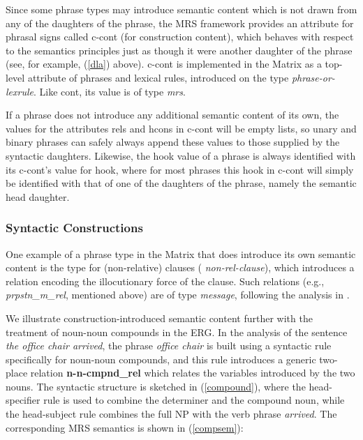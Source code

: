 \documentclass[12pt]{article}
\begin{document}
Since some phrase types may introduce semantic content which is not
drawn from any of the daughters of the phrase, the MRS framework
provides an attribute for phrasal signs called {\sc c-cont} (for
construction content), which behaves with respect to the semantics
principles just as though it were another daughter of the phrase (see,
for example, (\ref{dla}) above).  {\sc c-cont} is implemented in the
Matrix as a top-level attribute of phrases and lexical rules,
introduced on the type {\it phrase-or-lexrule}.  Like {\sc cont}, its
value is of type {\it mrs}.  

If a phrase does not introduce any additional semantic content of its
own, the values for the attributes {\sc rels} and {\sc hcons} in {\sc
c-cont} will be empty lists, so unary and binary phrases can safely
always append these values to those supplied by the syntactic
daughters.  Likewise, the {\sc hook} value of a phrase is always
identified with its {\sc c-cont}'s value for {\sc hook}, where for
most phrases this {\sc hook} in {\sc c-cont} will simply be identified
with that of one of the daughters of the phrase, namely the semantic
head daughter.

\subsubsection{Syntactic Constructions}

One example of a phrase type in the Matrix that does introduce its own
semantic content is the type for (non-relative) clauses ({\it
non-rel-clause}), which introduces a relation encoding the
illocutionary force of the clause.  Such relations (e.g., {\it
prpstn\_m\_rel}, mentioned above) are of type {\it message}, following the
analysis in \cite{Gin:Sag:00}.

We illustrate construction-introduced semantic content further with
the treatment of noun-noun compounds in the ERG.  In the analysis of the sentence {\it the office chair
arrived}, the phrase {\it office chair} is built using a syntactic
rule specifically for noun-noun compounds, and this rule introduces a
generic two-place relation {\bf n-n-cmpnd\_rel} which relates the variables
introduced by the two nouns.  The syntactic structure is sketched in
(\ref{compound}), where the head-specifier rule is used to combine the
determiner and the compound noun, while the head-subject rule combines
the full NP with the verb phrase {\it arrived}.  The corresponding MRS
semantics is shown in (\ref{compsem}):

\end{document}
